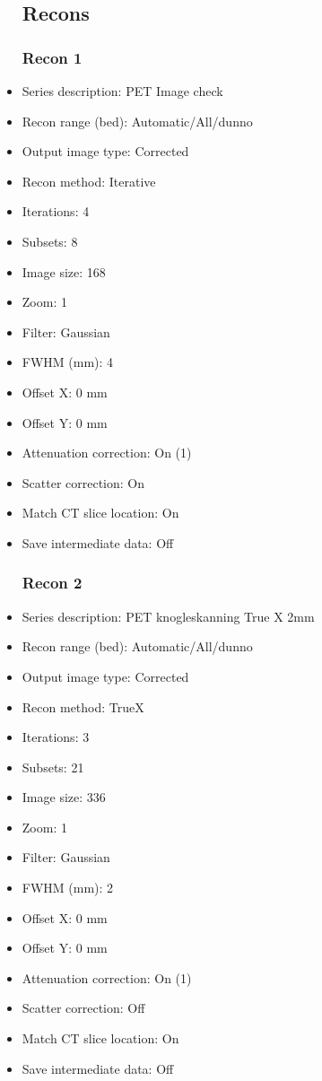 \documentclass[12pt]{article}
\begin{document}
\begin{itemize}
\subsection{Recons}
\subsubsection{Recon 1}
\item Series description: PET Image check
\item Recon range (bed): Automatic/All/dunno
\item Output image type: Corrected
\item Recon method: Iterative
\item Iterations: 4
\item Subsets: 8
\item Image size: 168
\item Zoom: 1
\item Filter: Gaussian
\item FWHM (mm): 4
\item Offset X: 0 mm
\item Offset Y: 0 mm
\item Attenuation correction: On (1)
\item Scatter correction: On
\item Match CT slice location: On
\item Save intermediate data: Off
\subsubsection{Recon 2}
\item Series description: PET knogleskanning  True X 2mm 
\item Recon range (bed): Automatic/All/dunno
\item Output image type: Corrected
\item Recon method: TrueX
\item Iterations: 3
\item Subsets: 21
\item Image size: 336
\item Zoom: 1
\item Filter: Gaussian
\item FWHM (mm): 2
\item Offset X: 0 mm
\item Offset Y: 0 mm
\item Attenuation correction: On (1)
\item Scatter correction: Off
\item Match CT slice location: On
\item Save intermediate data: Off

\end{itemize}
\end{document}
